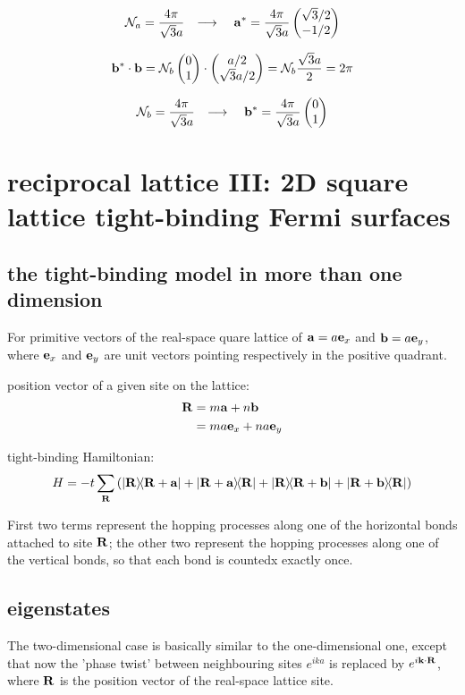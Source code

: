 \documentclass[10pt, a4paper, twocolumn]{article}
\newcommand{\arr}{\ensuremath{\longrightarrow\ }}
\begin{document}
\[\mathcal N_a = \frac{4\pi}{\sqrt 3a}
\qq{\arr} \vb a ^*=\frac{4\pi}{\sqrt 3 a}
\pmqty{\sqrt 3/2\\-1/2}\]

\[\vb b^*\cdot \vb b = \mathcal N_b \pmqty{0\\1}
\cdot \pmqty{a/2\\\sqrt 3a/2}
=\mathcal N_b\frac{\sqrt 3a}{2}=2\pi\]

\[\mathcal N_b = \frac{4\pi}{\sqrt 3a}
\qq{\arr} \vb b ^*=\frac{4\pi}{\sqrt 3 a}
\pmqty{0\\1}\]

\section{reciprocal lattice III: 2D square lattice tight-binding Fermi surfaces}

\subsection{the tight-binding model in more than one dimension}

For primitive vectors of the real-space quare lattice of $\vb a =a\vb e_x$ and $\vb b=a\vb e_y$, where $\vb e_x$ and $\vb e_y$ are unit vectors pointing respectively in the positive quadrant.

position vector of a given site on the lattice:
\begin{equation*}
\begin{aligned}
\vb R &= m\vb a+n\vb b
\\&=ma\vb e_x +na\vb e_y
\end{aligned}
\end{equation*}

tight-binding Hamiltonian:
\[H=-t\sum _{\vb R} \left( \dyad{\vb R}{\vb R+\vb a}
+ \dyad{\vb R+\vb a}{\vb R}
+ \dyad{\vb R}{\vb R+\vb b} + \dyad{\vb R+\vb b}{\vb R}
\right) \]

First two terms represent the hopping processes along one of the horizontal bonds attached to site $\vb R$; the other two represent the hopping processes along one of the vertical bonds, so that each bond is countedx exactly once.

\subsection{eigenstates}

The two-dimensional case is basically similar to the one-dimensional one, except that now the 'phase twist' between neighbouring sites $e^{ika}$ is replaced by $e^{i\vb k\cdot \vb R}$, where $\vb R$ is the position vector of the real-space lattice site.
\end{document}
